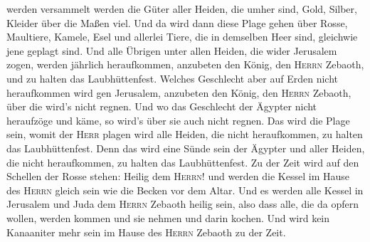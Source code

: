 werden versammelt werden die Güter aller Heiden, die umher sind, Gold,
Silber, Kleider über die Maßen viel.  Und da wird dann
diese Plage gehen über Rosse, Maultiere, Kamele, Esel und allerlei
Tiere, die in demselben Heer sind, gleichwie jene geplagt sind.
 Und alle Übrigen unter allen Heiden, die wider Jerusalem
zogen, werden jährlich heraufkommen, anzubeten den König, den
\textsc{Herrn} Zebaoth, und zu halten das Laubhüttenfest.
 Welches Geschlecht aber auf Erden nicht heraufkommen
wird gen Jerusalem, anzubeten den König, den \textsc{Herrn} Zebaoth,
über die wird's nicht regnen.  Und wo das Geschlecht der
Ägypter nicht heraufzöge und käme, so wird's über sie auch nicht regnen.
Das wird die Plage sein, womit der \textsc{Herr} plagen wird alle
Heiden, die nicht heraufkommen, zu halten das Laubhüttenfest.
 Denn das wird eine Sünde sein der Ägypter und aller
Heiden, die nicht heraufkommen, zu halten das Laubhüttenfest.
 Zu der Zeit wird auf den Schellen der Rosse stehen:
Heilig dem \textsc{Herrn}! und werden die Kessel im Hause des
\textsc{Herrn} gleich sein wie die Becken vor dem Altar. 
Und es werden alle Kessel in Jerusalem und Juda dem \textsc{Herrn}
Zebaoth heilig sein, also dass alle, die da opfern wollen, werden kommen
und sie nehmen und darin kochen. Und wird kein Kanaaniter mehr sein im
Hause des \textsc{Herrn} Zebaoth zu der Zeit.
